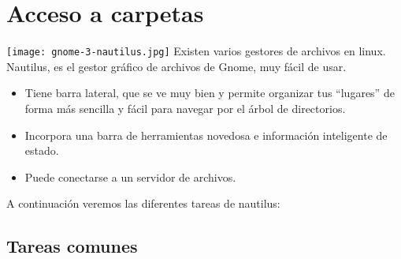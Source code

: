 \chapter{Acceso a carpetas}
\texttt{[image: gnome-3-nautilus.jpg]}
Existen varios gestores de archivos en linux.
Nautilus, es el gestor gráfico de archivos de Gnome, muy fácil de usar.
\begin{itemize}
\item Tiene barra lateral, que se ve muy bien y permite organizar tus “lugares” de forma más sencilla y fácil para navegar por el árbol de directorios.
\item Incorpora una barra de herramientas novedosa e información inteligente de estado.
\item Puede conectarse a un servidor de archivos.
\end{itemize}
A continuación veremos las diferentes tareas de nautilus:
\section{Tareas comunes}
